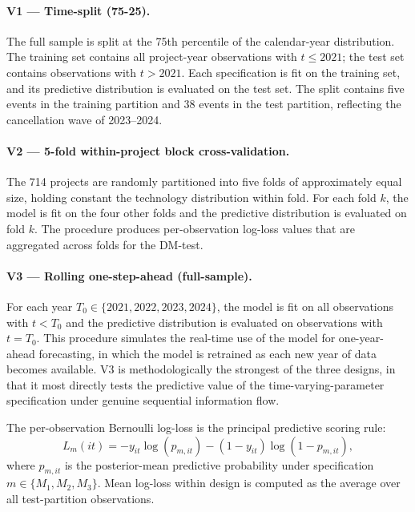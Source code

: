 \documentclass[12pt,a4paper]{article}
\theoremstyle{plain}
\theoremstyle{definition}
\begin{document}
\paragraph{V1 --- Time-split (75-25).}
The full sample is split at the 75th percentile of the calendar-year distribution. The training set contains all project-year observations with $t \leq 2021$; the test set contains observations with $t > 2021$. Each specification is fit on the training set, and its predictive distribution is evaluated on the test set. The split contains five events in the training partition and 38 events in the test partition, reflecting the cancellation wave of 2023--2024.

\paragraph{V2 --- 5-fold within-project block cross-validation.}
The 714 projects are randomly partitioned into five folds of approximately equal size, holding constant the technology distribution within fold. For each fold $k$, the model is fit on the four other folds and the predictive distribution is evaluated on fold $k$. The procedure produces per-observation log-loss values that are aggregated across folds for the DM-test.

\paragraph{V3 --- Rolling one-step-ahead (full-sample).}
For each year $T_0 \in \{2021, 2022, 2023, 2024\}$, the model is fit on all observations with $t < T_0$ and the predictive distribution is evaluated on observations with $t = T_0$. This procedure simulates the real-time use of the model for one-year-ahead forecasting, in which the model is retrained as each new year of data becomes available. V3 is methodologically the strongest of the three designs, in that it most directly tests the predictive value of the time-varying-parameter specification under genuine sequential information flow.

The per-observation Bernoulli log-loss is the principal predictive scoring rule:
\begin{equation}
L_m(it) = -y_{it} \log(p_{m,it}) - (1-y_{it}) \log(1 - p_{m,it}),
\label{eq:logloss}
\end{equation}
where $p_{m,it}$ is the posterior-mean predictive probability under specification $m \in \{M_1, M_2, M_3\}$. Mean log-loss within design is computed as the average over all test-partition observations.
\end{document}
